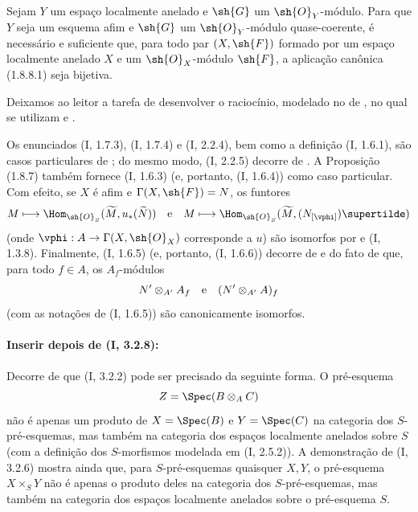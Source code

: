 \documentclass[oneside,10pt]{amsart}
\makeatletter
\newcommand{\ega@arrow}[2]{\mathchoice{#1}{#2}{#2}{#2}}
\renewcommand{\to}{\ega@arrow{\longrightarrow}{\rightarrow}}
\let\EGAOriginalLabel\label
\renewcommand{\label}[1]{\phantomsection\EGAOriginalLabel{#1}}
\makeatother
\begin{document}
\begin{corollary}[1.8.10]
\label{ega2:addendum:I.1.8.10}
Sejam $Y$ um espaço localmente anelado e $\sh{G}$ um
$\sh{O}_Y$-módulo. Para que $Y$ seja um esquema afim e $\sh{G}$ um
$\sh{O}_Y$-módulo quase-coerente, é necessário e suficiente que, para
todo par $(X,\sh{F})$ formado por um espaço localmente anelado $X$ e
um $\sh{O}_X$-módulo $\sh{F}$, a aplicação canônica (1.8.8.1) seja
bijetiva.
\end{corollary}

Deixamos ao leitor a tarefa de desenvolver o raciocínio, modelado no
de , no qual se utilizam  e
.

\begin{remark}[1.8.11]
\label{ega2:addendum:I.1.8.11}
Os enunciados (I, 1.7.3), (I, 1.7.4) e (I, 2.2.4), bem como a
definição (I, 1.6.1), são casos particulares de ; do
mesmo modo, (I, 2.2.5) decorre de . A Proposição
(1.8.7) também fornece (I, 1.6.3) (e, portanto, (I, 1.6.4)) como caso
particular. Com efeito, se $X$ é afim e $\Gamma(X,\sh{F})=N$, os
funtores
\[
  M\longmapsto
  \Hom_{\sh{O}_S}(\widetilde M,u_*(\widetilde N))
  \quad\hbox{e}\quad
  M\longmapsto
  \Hom_{\sh{O}_S}(\widetilde M,(N_{[\vphi]})\supertilde)
\]
(onde $\vphi:A\to\Gamma(X,\sh{O}_X)$ corresponde a $u$) são
isomorfos por  e (I, 1.3.8). Finalmente, (I, 1.6.5) (e,
portanto, (I, 1.6.6)) decorre de  e do fato de que, para
todo $f\in A$, os $A_f$-módulos
\[
  N'\otimes_{A'}A_f
  \quad\hbox{e}\quad
  (N'\otimes_{A'}A)_f
\]
(com as notações de (I, 1.6.5)) são canonicamente isomorfos.
\end{remark}

\paragraph{Inserir depois de (I, 3.2.8):}

\begin{env}[3.2.9]
\label{ega2:addendum:I.3.2.9}
Decorre de  que (I, 3.2.2) pode ser precisado da seguinte
forma. O pré-esquema
\[
  Z=\Spec(B\otimes_A C)
\]
não é apenas um produto de $X=\Spec(B)$ e $Y=\Spec(C)$ na categoria
dos $S$-pré-esquemas, mas também na categoria dos espaços localmente
anelados sobre $S$ (com a definição dos $S$-morfismos modelada em
(I, 2.5.2)). A demonstração de (I, 3.2.6) mostra ainda que, para
$S$-pré-esquemas quaisquer $X,Y$, o pré-esquema $X\times_S Y$ não é
apenas o produto deles na categoria dos $S$-pré-esquemas, mas também
na categoria dos espaços localmente anelados sobre o pré-esquema $S$.
\end{env}
\end{document}
